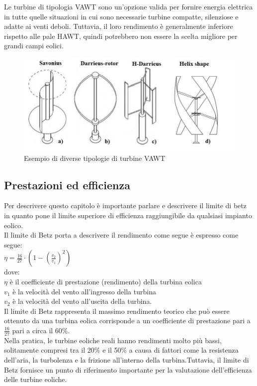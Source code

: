 Le turbine di tipologia VAWT sono un'opzione valida per fornire energia elettrica in tutte quelle situazioni in cui sono necessarie turbine compatte, silenziose e adatte ai venti deboli.
Tuttavia, il loro rendimento è generalmente inferiore rispetto alle pale HAWT, quindi potrebbero non essere la scelta migliore per grandi campi eolici.
\begin{figure}[H]
    \centering
    \includegraphics[height=0.3\textwidth]{res/cap 3/VAWT}
    \caption{Esempio di diverse tipologie di turbine VAWT}
\end{figure}\noindent
\subsection{Prestazioni ed efficienza}
Per descrivere questo capitolo è importante parlare e descrivere il limite di betz in quanto pone il limite superiore di efficienza raggiungibile da qualsiasi impianto eolico.\\
Il limite di Betz porta a descrivere il rendimento come segue è espresso come segue:\\
\large{$\eta = \frac{16}{27} \cdot (1 - (\frac{v_2}{v_1})^2)$}\\
dove:\\
\large{$\eta$} è il coefficiente di prestazione (rendimento) della turbina eolica\\
\large{$v_1$} è la velocità del vento all'ingresso della turbina\\
\large{$v_2$} è la velocità del vento all'uscita della turbina.\\
Il limite di Betz rappresenta il massimo rendimento teorico che può essere ottenuto da una turbina eolica corrisponde a un coefficiente di prestazione pari a $\frac{16}{27}$ pari a circa il 60\%.\\
Nella pratica, le turbine eoliche reali hanno rendimenti molto più bassi, solitamente compresi tra il 20\% e il 50\% a causa di fattori come la resistenza dell'aria, la turbolenza e la frizione all'interno della turbina.Tuttavia, il limite di Betz fornisce un punto di riferimento importante per la valutazione dell'efficienza delle turbine eoliche.
